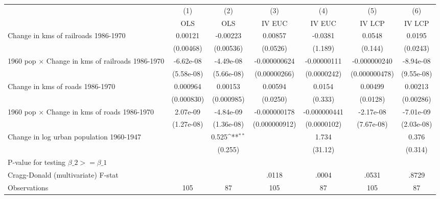 {
\def\sym#1{\ifmmode^{#1}\else\(^{#1}\)\fi}
\begin{tabular}{l*{6}{c}}
\hline\hline
                &\multicolumn{1}{c}{(1)}&\multicolumn{1}{c}{(2)}&\multicolumn{1}{c}{(3)}&\multicolumn{1}{c}{(4)}&\multicolumn{1}{c}{(5)}&\multicolumn{1}{c}{(6)}\\
                &\multicolumn{1}{c}{OLS}&\multicolumn{1}{c}{OLS}&\multicolumn{1}{c}{IV EUC}&\multicolumn{1}{c}{IV EUC}&\multicolumn{1}{c}{IV LCP}&\multicolumn{1}{c}{IV LCP}\\
\hline
Change in kms of railroads 1986-1970&  0.00121         & -0.00223         &  0.00857         &  -0.0381         &   0.0548         &   0.0195         \\
                &(0.00468)         &(0.00536)         & (0.0526)         &  (1.189)         &  (0.144)         & (0.0243)         \\
[1em]
1960 pop $\times$ Change in kms of railroads 1986-1970&-6.62e-08         &-4.49e-08         &-0.000000624         &-0.00000111         &-0.000000240         &-8.94e-08         \\
                &(5.58e-08)         &(5.66e-08)         &(0.00000266)         &(0.0000242)         &(0.000000478)         &(9.55e-08)         \\
[1em]
Change in kms of roads 1986-1970& 0.000964         &  0.00153         &  0.00594         &   0.0154         &  0.00499         &  0.00213         \\
                &(0.000830)         &(0.000985)         & (0.0250)         &  (0.333)         & (0.0128)         &(0.00286)         \\
[1em]
1960 pop $\times$ Change in kms of roads 1986-1970& 2.07e-09         &-4.84e-09         &-0.000000178         &-0.000000441         &-2.17e-08         &-7.01e-09         \\
                &(1.27e-08)         &(1.36e-08)         &(0.000000912)         &(0.0000102)         &(7.67e-08)         &(2.03e-08)         \\
[1em]
Change in log urban population 1960-1947&                  &    0.525\sym{**} &                  &    1.734         &                  &    0.376         \\
                &                  &  (0.255)         &                  &  (31.12)         &                  &  (0.314)         \\
\hline
P-value for testing $\beta\_{2} >= \beta\_{1}$&                  &                  &                  &                  &                  &                  \\
Cragg-Donald (multivariate) F-stat&                  &                  &    .0118         &    .0004         &    .0531         &    .8729         \\
Observations    &      105         &       87         &      105         &       87         &      105         &       87         \\
\hline\hline
\end{tabular}
}
